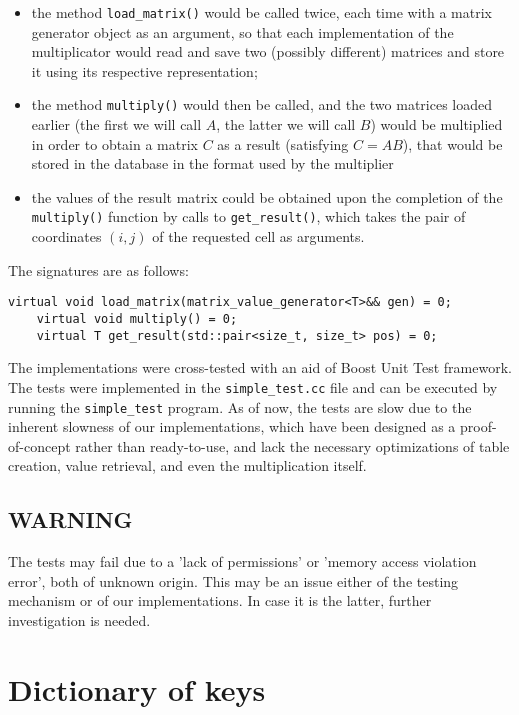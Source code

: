 \documentclass{article}
\newcommand{\code}[0]{\texttt}
\begin{document}
\begin{itemize}
\item the method \code{load\_matrix()} would be called twice, each time with a matrix generator object as an argument, so that each implementation of the multiplicator would read and save two (possibly different) matrices and store it using its respective representation;
\item the method \code{multiply()} would then be called, and the two matrices loaded earlier (the first we will call $A$, the latter we will call $B$) would be multiplied in order to obtain a matrix $C$ as a result (satisfying $C = AB$), that would be stored in the database in the format used by the multiplier
\item the values of the result matrix could be obtained upon the completion of the \code{multiply()} function by calls to \code{get\_result()}, which takes the pair of coordinates $(i, j)$ of the requested cell as arguments.
\end{itemize}

The signatures are as follows:

\begin{lstlisting}[style=CStyle]
    virtual void load_matrix(matrix_value_generator<T>&& gen) = 0;
    virtual void multiply() = 0;
    virtual T get_result(std::pair<size_t, size_t> pos) = 0;
\end{lstlisting}

The implementations were cross-tested with an aid of Boost Unit Test framework. The tests were implemented in the \code{simple\_test.cc} file and can be executed by running the \code{simple\_test} program. As of now, the tests are slow due to the inherent slowness of our implementations, which have been designed as a proof-of-concept rather than ready-to-use, and lack the necessary optimizations of table creation, value retrieval, and even the multiplication itself.

\subsection*{WARNING}
The tests may fail due to a 'lack of permissions' or 'memory access violation error', both of unknown origin. This may be an issue either of the testing mechanism or of our implementations. In case it is the latter, further investigation is needed.

\pagebreak
\section{Dictionary of keys}
\end{document}
